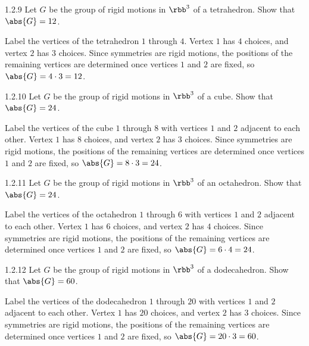 \begin{exercise}{1.2.9} 
    Let $G$ be the group of rigid motions in $\rbb^3$ of a tetrahedron.
	Show that $\abs{G} = 12$.
\end{exercise}

\begin{sol}
    Label the vertices of the tetrahedron $1$ through $4$.
    Vertex $1$ has $4$ choices, and vertex $2$ has $3$ choices.
    Since symmetries are rigid motions, the positions of the remaining vertices are determined once vertices $1$ and $2$ are fixed, so $\abs{G} = 4 \cdot 3 = 12$.
\end{sol}

\begin{exercise}{1.2.10}
    Let $G$ be the group of rigid motions in $\rbb^3$ of a cube.
	Show that $\abs{G} = 24$.
\end{exercise}

\begin{sol}
    Label the vertices of the cube $1$ through $8$ with vertices $1$ and $2$ adjacent to each other.
    Vertex $1$ has $8$ choices, and vertex $2$ has $3$ choices.
    Since symmetries are rigid motions, the positions of the remaining vertices are determined once vertices $1$ and $2$ are fixed, so $\abs{G} = 8 \cdot 3 = 24$.
\end{sol}

\begin{exercise}{1.2.11}
    Let $G$ be the group of rigid motions in $\rbb^3$ of an octahedron.
	Show that $\abs{G} = 24$.
\end{exercise}

\begin{sol}
    Label the vertices of the octahedron $1$ through $6$ with vertices $1$ and $2$ adjacent to each other.
    Vertex $1$ has $6$ choices, and vertex $2$ has $4$ choices.
    Since symmetries are rigid motions, the positions of the remaining vertices are determined once vertices $1$ and $2$ are fixed, so $\abs{G} = 6 \cdot 4 = 24$.
\end{sol}

\begin{exercise}{1.2.12}
    Let $G$ be the group of rigid motions in $\rbb^3$ of a dodecahedron.
	Show that $\abs{G} = 60$.
\end{exercise}

\begin{sol}
    Label the vertices of the dodecahedron $1$ through $20$ with vertices $1$ and $2$ adjacent to each other.
    Vertex $1$ has $20$ choices, and vertex $2$ has $3$ choices.
    Since symmetries are rigid motions, the positions of the remaining vertices are determined once vertices $1$ and $2$ are fixed, so $\abs{G} = 20 \cdot 3 = 60$.
\end{sol}

